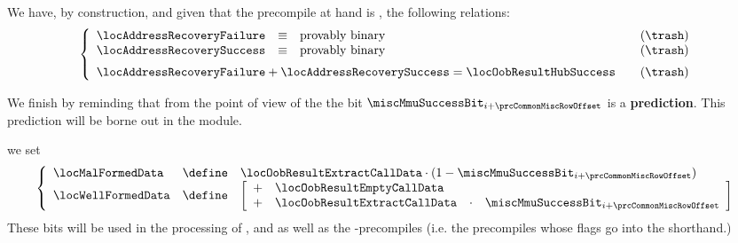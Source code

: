 \begin{description}
\begin{description}
\begin{description}
						\saNote{}
						We have, by construction, and given that the precompile at hand is \instEcrecover{}, the following relations:
						\[
							\left\{ \begin{array}{lclr}
								\locAddressRecoveryFailure   & \equiv & \text{provably binary} & \quad (\trash) \\
								\locAddressRecoverySuccess   & \equiv & \text{provably binary} & \quad (\trash) \vspace{2mm} \\
								\multicolumn{3}{l}{\locAddressRecoveryFailure + \locAddressRecoverySuccess = \locOobResultHubSuccess} & \quad (\trash) \\
							\end{array} \right.
						\]

						\saNote{}
						We finish by reminding that from the point of view of the \hubMod{} the bit $\miscMmuSuccessBit_{i + \prcCommonMiscRowOffset}$ is a \textbf{prediction}.
						This prediction will be borne out in the \ecDataMod{} module.
					\item[\underline{\instEcadd{}, \instEcmul{} and \instEcpairing{} as well as \inst{BLS}-precompile specific:}]
						we set
						\[
							\left\{ \begin{array}{lcl}
								\locMalFormedData  & \define & \locOobResultExtractCallData \cdot (1 - \miscMmuSuccessBit_{i + \prcCommonMiscRowOffset}) \\
								\locWellFormedData & \define & 
								\left[ \begin{array}{clcl}
									+ & \locOobResultEmptyCallData                                        \\
									+ & \locOobResultExtractCallData & \cdot & \miscMmuSuccessBit_{i + \prcCommonMiscRowOffset} \\
								\end{array} \right] \\
							\end{array} \right.
						\]
						\saNote{}
						These bits will be used in the processing of \instEcadd{}, \instEcmul{} and \instEcpairing{}
						as well as the -precompiles (i.e. the precompiles whose flags go into the \scenPrecompileCommonBls{} shorthand.)


\end{description}
\end{description}
\end{description}
